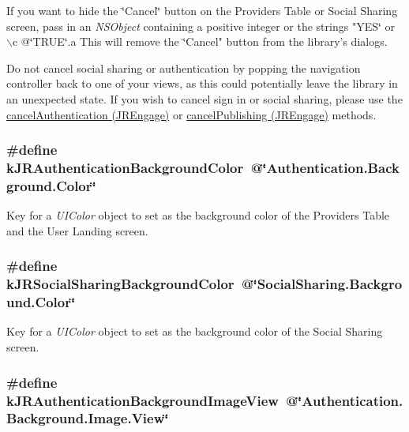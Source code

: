 If you want to hide the \char`\"{}Cancel\char`\"{} button on the Providers Table or Social Sharing screen, pass in an {\itshape NSObject\/} containing a positive integer or the strings {\ttfamily "YES\char`\"{} or $\backslash$c @\char`\"{}TRUE\char`\"{}.a This will
 remove the \char`\"{}Cancel"} button from the library's dialogs.

Do not cancel social sharing or authentication by popping the navigation controller back to one of your views, as this could potentially leave the library in an unexpected state. If you wish to cancel sign in or social sharing, please use the \hyperlink{class_j_r_engage_a17b67c9bb98230fb7d59f8c35a20662b}{cancelAuthentication (JREngage)} or \hyperlink{class_j_r_engage_a205c368338061976178a5b0e36f2d4f2}{cancelPublishing (JREngage)} methods. \hypertarget{group__custom_interface_gacfe014997457d27386eff69eb731ce0f}{
\subsubsection[{kJRAuthenticationBackgroundColor}]{\setlength{\rightskip}{0pt plus 5cm}\#define kJRAuthenticationBackgroundColor~@\char`\"{}Authentication.Background.Color\char`\"{}}}
\label{group__custom_interface_gacfe014997457d27386eff69eb731ce0f}
Key for a {\itshape UIColor\/} object to set as the background color of the Providers Table and the User Landing screen. \hypertarget{group__custom_interface_ga404751db179428ee64bbe2fda663efa6}{
\subsubsection[{kJRSocialSharingBackgroundColor}]{\setlength{\rightskip}{0pt plus 5cm}\#define kJRSocialSharingBackgroundColor~@\char`\"{}SocialSharing.Background.Color\char`\"{}}}
\label{group__custom_interface_ga404751db179428ee64bbe2fda663efa6}
Key for a {\itshape UIColor\/} object to set as the background color of the Social Sharing screen. \hypertarget{group__custom_interface_ga68a4950b1b3834ce60218856f596059f}{
\subsubsection[{kJRAuthenticationBackgroundImageView}]{\setlength{\rightskip}{0pt plus 5cm}\#define kJRAuthenticationBackgroundImageView~@\char`\"{}Authentication.Background.Image.View\char`\"{}}}
